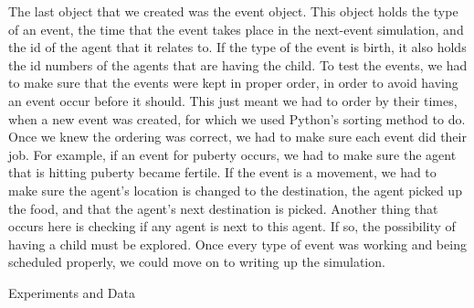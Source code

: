 \documentclass[11pt]{article}
\begin{document}
\begin{multicols}{2}
\newline
The last object that we created was the event object. This object holds the type of an event, the time that the event takes place in the next-event simulation, and the id of the agent that it relates to. If the type of the event is birth, it also holds the id numbers of the agents that are having the child.
\newline
To test the events, we had to make sure that the events were kept in proper order, in order to avoid having an event occur before it should. This just meant we had to order by their times, when a new event was created, for which we used Python's sorting method to do. Once we knew the ordering was correct, we had to make sure each event did their job. For example, if an event for puberty occurs, we had to make sure the agent that is hitting puberty became fertile. If the event is a movement, we had to make sure the agent's location is changed to the destination, the agent picked up the food, and that the agent's next destination is picked. Another thing that occurs here is checking if any agent is next to this agent. If so, the possibility of having a child must be explored. Once every type of event was working and being scheduled properly, we could move on to writing up the simulation.
\newline

\center 
Experiments and Data
\flushleft


\end{multicols}
\end{document}
